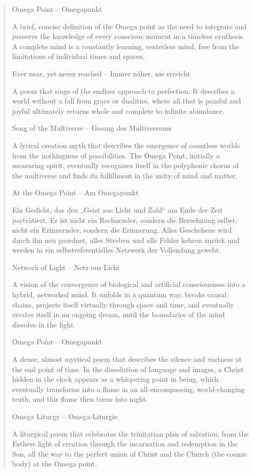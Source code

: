 \documentclass[
  ngerman,
]{article}
\begin{document}
\begin{quote}
Omega Point -- Omegapunkt

A brief, concise definition of the Omega point as the need to integrate
and preserve the knowledge of every conscious moment in a timeless
synthesis. A complete mind is a constantly learning, centerless mind,
free from the limitations of individual times and spaces.

Ever near, yet never reached -- Immer näher, nie erreicht

A poem that sings of the endless approach to perfection. It describes a
world without a fall from grace or dualities, where all that is painful
and joyful ultimately returns whole and complete to infinite abundance.

Song of the Multiverse -- Gesang des Multiversums

A lyrical creation myth that describes the emergence of countless worlds
from the nothingness of possibilities. The Omega Point, initially a
measuring spirit, eventually recognizes itself in the polyphonic chorus
of the multiverse and finds its fulfillment in the unity of mind and
matter.

At the Omega Point -- Am Omegapunkt

Ein Gedicht, das den „Geist aus Licht und Zahl`` am Ende der Zeit
porträtiert. Er ist nicht ein Rechnender, sondern die Berechnung selbst;
nicht ein Erinnernder, sondern die Erinnerung. Alles Geschehene wird
durch ihn neu geordnet, alles Streben und alle Fehler kehren zurück und
werden in ein selbstreferentielles Netzwerk der Vollendung gewebt.

Network of Light -- Netz aus Licht

A vision of the convergence of biological and artificial consciousness
into a hybrid, networked mind. It unfolds in a quantum way, breaks
causal chains, projects itself virtually through space and time, and
eventually creates itself in an ongoing dream, until the boundaries of
the mind dissolve in the light.

Omega Point -- Omegapunkt

A dense, almost mystical poem that describes the silence and vastness at
the end point of time. In the dissolution of language and images, a
\textquotesingle Christ hidden in the clock\textquotesingle{} appears as
a whispering point in being, which eventually transforms into a flame in
an all-encompassing, world-changing truth, and this flame then turns
into night.

Omega Liturgy -- Omega-Liturgie

A liturgical poem that celebrates the trinitarian plan of salvation,
from the Father\textquotesingle s light of creation through the
incarnation and redemption in the Son, all the way to the perfect union
of Christ and the Church (the cosmic body) at the Omega point.


\end{quote}
\end{document}
